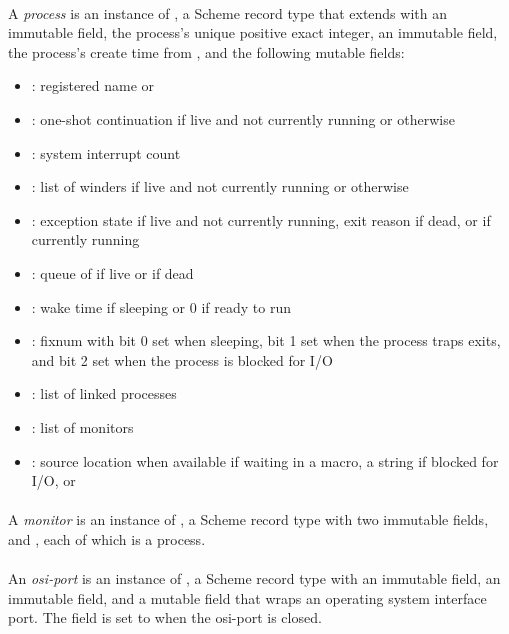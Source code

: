 \paragraph {}
A \emph{process} is an instance of , a Scheme record type
that extends  with an immutable  field, the process's
unique positive exact integer, an immutable  field,
the process's create time from , and the following
mutable fields:
\begin{itemize}
\item {}: registered name or 
\item {}: one-shot continuation if live and not currently
  running or  otherwise
\item {}: system interrupt count
\item {}: list of winders if live and not currently
  running or \code{()} otherwise
\item {}: exception state if live and not
  currently running, exit reason if dead, or  if currently
  running
\item {}: queue of  if live or  if
  dead
\item {}: wake time if sleeping or 0 if ready to run
\item {}: fixnum with bit 0 set when sleeping, bit 1 set
  when the process traps exits, and bit 2 set when the process is
  blocked for I/O
\item {}: list of linked processes
\item {}: list of monitors
\item {}: source location  when available if waiting in a 
  macro, a string if blocked for I/O, or 
\end{itemize}

\paragraph {}
A \emph{monitor} is an instance of , a Scheme record type
with two immutable fields,  and , each
of which is a process.

\paragraph {}
An \emph{osi-port} is an instance of , a Scheme record
type with an immutable  field, an immutable
 field, and a mutable  field that wraps
an operating system interface port. The  field is set to
 when the osi-port is closed.

